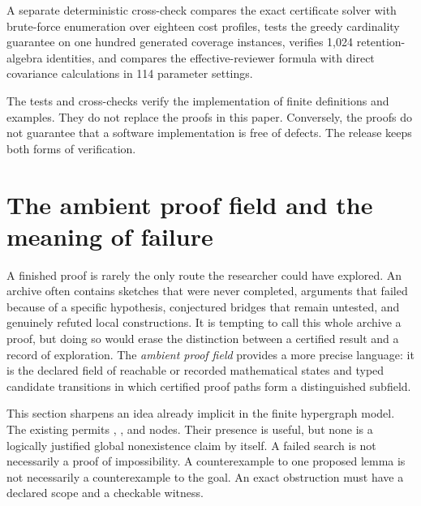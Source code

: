 \documentclass[11pt,oneside]{article}
\theoremstyle{definition}
\theoremstyle{remark}
\begin{document}
A separate deterministic cross-check compares the exact certificate solver with brute-force enumeration over eighteen cost profiles, tests the greedy cardinality guarantee on one hundred generated coverage instances, verifies 1,024 retention-algebra identities, and compares the effective-reviewer formula with direct covariance calculations in 114 parameter settings.

The tests and cross-checks verify the implementation of finite definitions and examples. They do not replace the proofs in this paper. Conversely, the proofs do not guarantee that a software implementation is free of defects. The release keeps both forms of verification.

\section{The ambient proof field and the meaning of failure}
\label{sec:ambient}

A finished proof is rarely the only route the researcher could have explored. An archive often contains sketches that were never completed, arguments that failed because of a specific hypothesis, conjectured bridges that remain untested, and genuinely refuted local constructions. It is tempting to call this whole archive a proof, but doing so would erase the distinction between a certified result and a record of exploration. The \emph{ambient proof field} provides a more precise language: it is the declared field of reachable or recorded mathematical states and typed candidate transitions in which certified proof paths form a distinguished subfield.

This section sharpens an idea already implicit in the finite hypergraph model. The existing  permits , , and  nodes. Their presence is useful, but none is a logically justified global nonexistence claim by itself. A failed search is not necessarily a proof of impossibility. A counterexample to one proposed lemma is not necessarily a counterexample to the goal. An exact obstruction must have a declared scope and a checkable witness.
\end{document}
